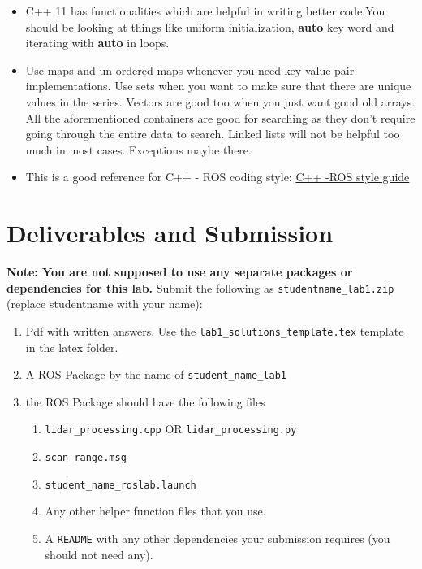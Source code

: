 \documentclass[letta4 paper]{article}
\numberwithin{equation}{section}
\newcommand{\0}{\mathbf{0}}
\begin{document}
\begin{enumerate}
\begin{itemize}
			\item C++ 11 has functionalities which are helpful in writing better code.You should be looking at things like uniform initialization, \textbf{auto} key word and iterating with \textbf{auto} in loops. 
			\item Use maps and un-ordered maps whenever you need key value pair implementations. Use sets when you want to make sure that there are unique values in the series. Vectors are good too when you just want good old arrays. All the aforementioned containers are good for searching as they don't require going through the entire data to search. Linked lists will not be helpful too much in most cases. Exceptions maybe there.
			\item This is a good reference for C++ - ROS coding style: \href{http://wiki.ros.org/CppStyleGuide}{C++ -ROS style guide}
		\end{itemize}{}
	\end{enumerate}{}



	\section{Deliverables and Submission}
	\textbf{Note: You are not supposed to use any separate packages or dependencies for this lab. }
	Submit the following as \texttt{studentname\_lab1.zip} (replace studentname with your name):
	

	\begin{enumerate}
    \item Pdf with written answers. Use the \texttt{lab1\_solutions\_template.tex} template in the latex folder.
	\item A ROS Package by the name of \: \texttt{student\_name\_lab1 }
	\item the ROS Package should have the following files
	\begin{enumerate}
		\item \texttt{lidar\_processing.cpp} OR \texttt{lidar\_processing.py}
		\item \texttt{scan\_range.msg}
		\item \texttt{student\_name\_roslab.launch}
		\item Any other helper function files that you use.
		\item A \texttt{README} with any other dependencies your submission requires (you should not need any). 
	\end{enumerate}{}
	\end{enumerate}
\end{document}
